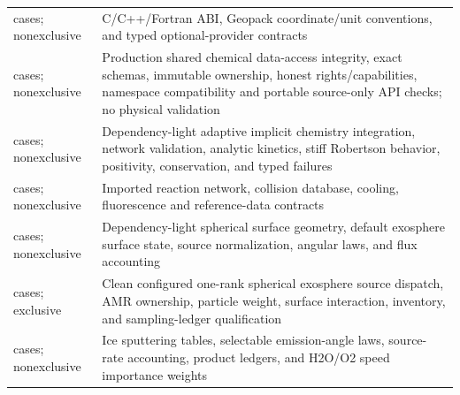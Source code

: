 \begin{longtable}{L{0.38\textwidth}L{0.51\textwidth}}
 cases; nonexclusive & C/C++/Fortran ABI, Geopack coordinate/unit conventions, and typed optional-provider contracts\newline{}\\
 cases; nonexclusive & Production shared chemical data-access integrity, exact schemas, immutable ownership, honest rights/capabilities, namespace compatibility and portable source-only API checks; no physical validation\newline{}\\
 cases; nonexclusive & Dependency-light adaptive implicit chemistry integration, network validation, analytic kinetics, stiff Robertson behavior, positivity, conservation, and typed failures\newline{}\\
 cases; nonexclusive & Imported reaction network, collision database, cooling, fluorescence and reference-data contracts\newline{}\\
 cases; nonexclusive & Dependency-light spherical surface geometry, default exosphere surface state, source normalization, angular laws, and flux accounting\newline{}\\
 cases; exclusive & Clean configured one-rank spherical exosphere source dispatch, AMR ownership, particle weight, surface interaction, inventory, and sampling-ledger qualification\newline{}\\
 cases; nonexclusive & Ice sputtering tables, selectable emission-angle laws, source-rate accounting, product ledgers, and H2O/O2 speed importance weights\newline{}\\

\end{longtable}
